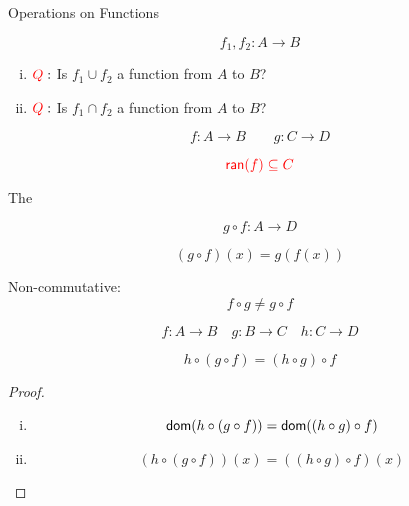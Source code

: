 \begin{frame}{}
  \begin{center}
    {\LARGE Operations on Functions}
  \end{center}
\end{frame}

\begin{frame}{}
  \begin{definition}
    \[
      f_1, f_2: A \to B
    \]

    \begin{enumerate}[(i)]
	\centering
      \item $\textcolor{red}{Q}:$ Is $f_1 \cup f_2$ a function from $A$ to $B$?
      \item $\textcolor{red}{Q}:$ Is $f_1 \cap f_2$ a function from $A$ to $B$?
    \end{enumerate}
  \end{definition}
\end{frame}

\begin{frame}{}
  \begin{definition}[Composition]
    \[
      f: A \to B \qquad g: C \to D
    \]

    \[
      \textcolor{red}{\textsf{ran}(f) \subseteq C}
    \]

    The 

    \[
      g \circ f : A \to D
    \]

    \[
      (g \circ f) (x) = g(f(x))
    \]
  \end{definition}

  \pause
  \begin{alertblock}{Non-commutative:}
    \[
      f \circ g \neq g \circ f
    \]
  \end{alertblock}
\end{frame}

\begin{frame}{}
  \begin{theorem}
    \[
      f: A \to B \quad g: B \to C \quad h: C \to D
    \]

    \[
      h \circ (g \circ f) = (h \circ g) \circ f
    \]
  \end{theorem}

  \pause
  \vspace{0.60cm}
  \begin{proof}
    \begin{enumerate}[(i)]
      \item 
	\[
	  \textsf{dom}(h \circ (g \circ f)) = \textsf{dom}((h \circ g) \circ f)
	\]
      \item 
	\[
	  (h \circ (g \circ f))(x) = ((h \circ g) \circ f)(x)
	\]
    \end{enumerate}
  \end{proof}
\end{frame}

